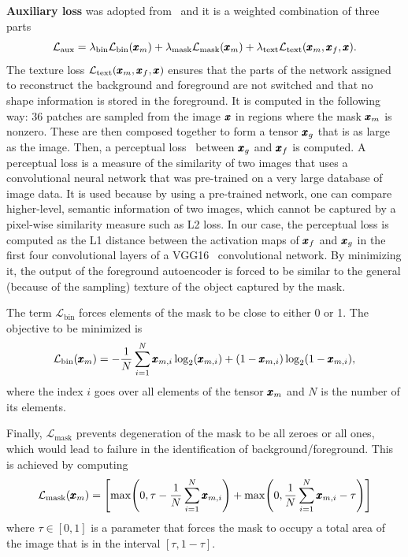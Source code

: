\textbf{Auxiliary loss} was adopted from~\cite{sauer2021counterfactual} and it is a weighted combination of three parts
\begin{equation} \label{eq:auxloss}
    \mathcal{L}_{\text{aux}} = \lambda_{\text{bin}}\mathcal{L}_{\text{bin}}(\pmb{{x}}_m) + \lambda_{\text{mask}}\mathcal{L}_{\text{mask}}(\pmb{{x}}_m) + \lambda_{\text{text}}\mathcal{L}_{\text{text}}(\pmb{{x}}_m,\pmb{{x}}_f,\pmb{{x}}).
\end{equation} 
The texture loss $\mathcal{L}_{\text{text}}(\pmb{{x}}_m,\pmb{{x}}_f,\pmb{{x}})$ ensures that the parts of the network assigned to reconstruct the background and foreground are not switched and that no shape information is stored in the foreground. It is computed in the following way: 36 patches are sampled from the image $\pmb{{x}}$ in regions where the mask $\pmb{{x}}_m$ is nonzero. These are then composed together to form a tensor $\pmb{{x}}_g$ that is as large as the image. Then, a perceptual loss~\cite{johnson2016perceptual} between $\pmb{{x}}_g$ and $\pmb{{x}}_f$ is computed. A perceptual loss is a measure of the similarity of two images that uses a convolutional neural network that was pre-trained on a very large database of image data. It is used because by using a pre-trained network, one can compare higher-level, semantic information of two images, which cannot be captured by a pixel-wise similarity measure such as L2 loss. In our case, the perceptual loss is computed as the L1 distance between the activation maps of $\pmb{{x}}_f$ and $\pmb{{x}}_g$ in the first four convolutional layers of a VGG16~\cite{simonyan2014very} convolutional network. By minimizing it, the output of the foreground autoencoder is forced to be similar to the general (because of the sampling) texture of the object captured by the mask.

The term $\mathcal{L}_{\text{bin}}$ forces elements of the mask to be close to either 0 or 1. The objective to be minimized is
\begin{equation}
    \mathcal{L}_{\text{bin}}(\pmb{{x}}_m) = - \frac{1}{N} \sum_{i=1}^N \pmb{{x}}_{m,i} \log_2(\pmb{{x}}_{m,i}) + (1-\pmb{{x}}_{m,i}) \log_2(1 - \pmb{{x}}_{m,i}),
\end{equation}
where the index $i$ goes over all elements of the tensor $\pmb{{x}}_m$ and $N$ is the number of its elements.

 Finally, $\mathcal{L}_{\text{mask}}$ prevents degeneration of the mask to be all zeroes or all ones, which would lead to failure in the identification of background/foreground. This is achieved by computing
  \begin{equation}
    \mathcal{L}_{\text{mask}}(\vc{x}_m) = \left[ \max \left( 0, \tau - \frac{1}{N} \sum_{i=1}^N \vc{x}_{m,i} \right) + \max \left( 0, \frac{1}{N} \sum_{i=1}^N \vc{x}_{m,i} -\tau  \right) \right]
\end{equation}
where $\tau \in [0,1]$ is a parameter that forces the mask to occupy a total area of the image that is in the interval $[\tau, 1-\tau]$. 


